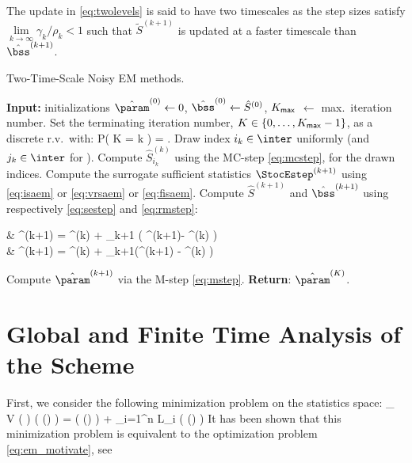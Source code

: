 \documentclass[11pt]{article}
\makeatletter
\theoremstyle{t}
\DeclareRobustCommand*\cal{\@fontswitch\relax\mathcal}
\makeatother
\begin{document}
The update in \eqref{eq:twolevels} is said to have two timescales as the step sizes satisfy $\lim \limits_{k \to \infty} \gamma_k/\rho_k < 1$ such that $ \tilde{S}^{(k+1)} $  is updated at a faster timescale than $\hat{\bss}^{(k+1)}$.

\begin{algorithm}[H]
\caption{Two-Time-Scale Noisy EM methods.}\label{alg:ttsem}
  \begin{algorithmic}[1]
  \STATE \textbf{Input:} initializations $\hat{\param}^{(0)} \leftarrow 0$, $\hat{\bss}^{(0)} \leftarrow \hat{S}^{(0)}$, $K_{\sf max}$ $\leftarrow$ max.~iteration number. \STATE Set the terminating iteration number, $K \in \{0,\dots,K_{\sf max}-1\}$, as a discrete r.v.~with:\vspace{-.1cm}
  \beq \label{eq:random}
   P( K = k ) = .\vspace{-.2cm}
  \eeq
  \STATE Draw index $i_k \in \inter$ uniformly (and $j_k \in \inter$ for \FISAEM).
     \STATE Compute $\hat{S}_{i_k}^{(k)}$ using the {\sf MC-step} \eqref{eq:mcstep},  for the drawn indices.
   \STATE Compute the surrogate sufficient statistics $\StocEstep^{(k+1)}$ using \eqref{eq:isaem} or \eqref{eq:vrsaem} or \eqref{eq:fisaem}.
   \STATE Compute $\hat{S}^{(k+1)}$ and $\hat{\bss}^{(k+1)}$ using respectively \eqref{eq:sestep} and \eqref{eq:rmstep}:
\beq \label{eq:twolevels}
\begin{split}
& ^{(k+1)} = ^{(k)} + \rho_{k+1} \big( \StocEstep^{(k+1)}- ^{(k)}  \big)\\
&  \hat{\bss}^{(k+1)} =  \hat{\bss}^{(k)}  + \gamma_{k+1}(^{(k+1)} - \hat{\bss}^{(k)} )
\end{split}
\eeq
   \STATE Compute $\hat{\param}^{(k+1)}$ via the {\sf M-step} \eqref{eq:mstep}.
\ENDFOR
\STATE \textbf{Return}: $\hat{\param}^{(K)}$.
  \end{algorithmic}
\end{algorithm}



\section{Global and Finite Time Analysis of the Scheme} \label{sec:mainanalysis}
First, we consider the following minimization problem on the statistics space:
\beq\label{eq:em_sspace}
\min_{ {\bss} \in \Sset }~  V ( {\bss} ) \eqdef \overline\calL( \op(\bss) ) = \Pen (  \op(\bss) ) +  \sum_{i=1}^n {\cal L}_i (  \op(\bss) )
\eeq
It has been shown that this minimization problem is equivalent to the optimization problem \eqref{eq:em_motivate}, see \citep[Lemma2]{karimi2019global}
\end{document}
